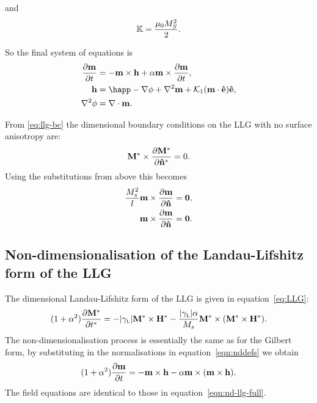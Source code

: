 and
\begin{equation}
  \label{k-normalisation}
  \mathbb{K} = \frac{ \mu_0 M_S^2}{2}.
\end{equation}

So the final system of equations is
\begin{equation}
  \begin{aligned}
    \dmdt &= - \mv \times \hv + \alpha \mv \times \dmdt, \\
    \hv &= \happ - \nabla \phi + \lap \mv + \kone (\mv \cdot \ev) \ev, \\
    \lap \phi &= \nabla \cdot \mv.
    \label{eqn:nd-llg-full}
  \end{aligned}
\end{equation}

From \cref{eq:llg-bc} the dimensional boundary conditions on the LLG with no surface anisotropy are:
\begin{equation}
  \mathbf{M}^* \times \frac{\partial \mathbf{M}^*}{\partial \mathbf{\hat{n}}^*} = 0.
\end{equation}
Using the substitutions from above this becomes
\begin{equation}
  \begin{aligned}
    \frac{M_s^2}{l} \mathbf{m} \times \frac{\partial \mathbf{m}}{\partial \mathbf{\hat{n}}} &= \mathbf{0}, \\
    \mathbf{m} \times \frac{\partial \mathbf{m}}{\partial \mathbf{\hat{n}}} &= \mathbf{0}.
  \end{aligned}
\end{equation}

\subsection{Non-dimensionalisation of the Landau-Lifshitz form of the LLG}
\label{sec:land-lifsh-normalisation}

The dimensional Landau-Lifshitz form of the LLG is given in equation~\cref{eq:LLG}:
\begin{equation}
  \label{eq:ll-nd}
  (1 + \alpha^2) \frac{\partial \mathbf{M}^*}{\partial t^*} = - {\left|{\gamma_{\text{\tiny{L}}}} \right|} \mathbf{M}^* \times \mathbf{H}^*
  - \frac{{\left|{\gamma_{\text{\tiny{L}}}} \right|} \alpha}{M_s} \mathbf{M}^* \times (\mathbf{M}^* \times \mathbf{H}^*).
\end{equation}
The non-dimensionalisation process is essentially the same as for the Gilbert form, by substituting in the normalisations in equation~\cref{eqn:nddefs} we obtain
\begin{equation}
  (1 + \alpha^2) \frac{\partial \mathbf{m}}{\partial t} = - \mathbf{m} \times \mathbf{h} - \alpha \mathbf{m} \times (\mathbf{m} \times \mathbf{h}).
  \label{eq:ll-nd-llglike}
\end{equation}
The field equations are identical to those in equation~\cref{eqn:nd-llg-full}.



